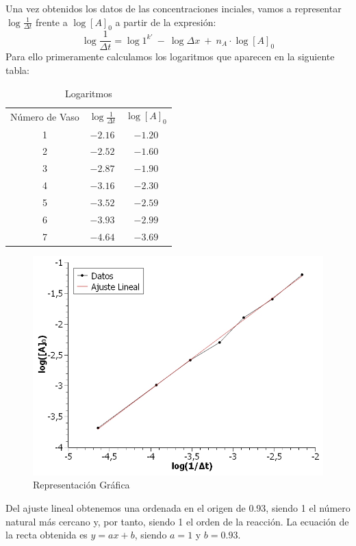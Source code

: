\noindent Una vez obtenidos los datos de las concentraciones inciales, vamos a representar $\log \frac{1}{\Delta \si{t}}$ frente a $\log [A]_0$ a partir de la expresión:
\[\log \frac{1}{\Delta \si{t}} = \log 1^{k'}\ - \ \log\Delta x\ +\ n_A\cdot\log [A]_0\]
\noindent Para ello primeramente calculamos los logaritmos que aparecen en la siguiente tabla:
\begin{table}[H]
\centering
\begin{tabular}{ccc}
\rowcolor[HTML]{F6D594} 
Número de Vaso & $\log \frac{1}{\Delta\si{t}}$ & $\log [A]_0$ \\
\rowcolor[HTML]{EAEABE} 
1 & $-2.16$ & $-1.20$ \\
2 & $-2.52$ & $-1.60$ \\
\rowcolor[HTML]{EAEABE} 
3 & $-2.87$ & $-1.90$ \\
4 & $-3.16$ & $-2.30$ \\
\rowcolor[HTML]{EAEABE} 
5 & $-3.52$ & $-2.59$ \\
6 & $-3.93$ & $-2.99$ \\
\rowcolor[HTML]{EAEABE} 
7 & $-4.64$ & $-3.69$
\end{tabular}
\caption{Logaritmos}
\label{logaritmos}
\end{table}

\begin{figure}[H]
    \centering
    \hspace*{-3cm}
        \includegraphics[scale = 0.5]{prac7/logaritmos.jpg}
    \hspace*{-3cm}
    \caption{Representación Gráfica}
\end{figure}

\noindent Del ajuste lineal obtenemos una ordenada en el origen de 0.93, siendo 1 el número natural más cercano y, por tanto, siendo 1 el orden de la reacción. La ecuación de la recta obtenida es $y = ax+b$, siendo $a = 1$ y $b = 0.93$.